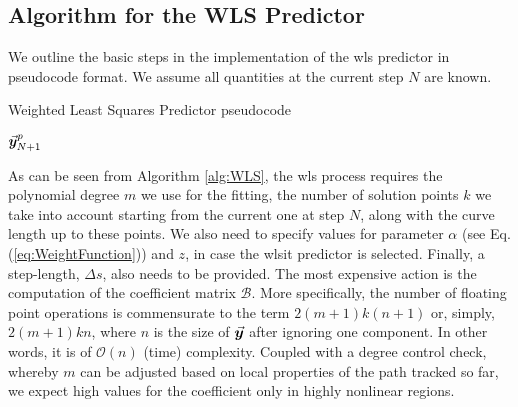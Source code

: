 \subsection{Algorithm for the WLS Predictor}\label{CH5-S3SS1}
We outline the basic steps in the implementation of the \acrshort{wls}
predictor in pseudocode format. We assume all quantities at the current step
$N$ are known.

\begin{algorithm}[t]
	\caption{Weighted Least Squares Predictor pseudocode}
	\label{alg:WLS}
	\begin{algorithmic}
		\ENDFOR
		\STATE{}
		\STATE{}
		\STATE{}
		\RETURN $\vec{\bm{y}}^p_{N+1}$
	\end{algorithmic}
\end{algorithm}

As can be seen from Algorithm \ref{alg:WLS}, the \acrshort{wls} process 
requires the 
polynomial degree  $m$ we use for the fitting, the number of solution 
points $k$ we take into account starting from the current one at step $N$, 
along with the curve length up to these points. We also need to specify values 
for
parameter $\alpha$ (see Eq. (\ref{eq:WeightFunction})) and $z$, in case the 
\acrshort{wlsit}
predictor is selected. Finally, a step-length, $\Delta s$, also needs to be
provided. The most expensive action is the computation of the coefficient matrix
$\bm{\mathcal{B}}$. More specifically, the number of floating point operations 
is
commensurate to the term $2(m+1)k(n+1)$ or, simply, $2(m+1)kn$, where $n$ is
the size of $\vec{\bm{y}}$ after ignoring one component. In other words, it
is of $\mathcal{O}(n)$ (time) complexity. Coupled with a degree control check, 
whereby
$m$ can be adjusted based on local properties of the path tracked so far, we 
expect high values for the coefficient only in highly nonlinear regions. 

